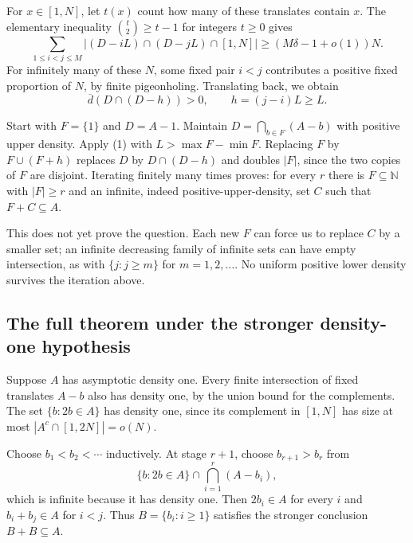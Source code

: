 For $x\in[1,N]$, let $t(x)$ count how many of these translates contain $x$. The elementary inequality $\binom t2\geq t-1$ for integers $t\geq0$ gives
\[
\sum_{1\leq i<j\leq M}|(D-iL)\cap(D-jL)\cap[1,N]|
\geq (M\delta-1+o(1))N.
\]
For infinitely many of these $N$, some fixed pair $i<j$ contributes a positive fixed proportion of $N$, by finite pigeonholing. Translating back, we obtain
\[
\overline d(D\cap(D-h))>0,\qquad h=(j-i)L\geq L.
\tag{1}
\]

Start with $F=\{1\}$ and $D=A-1$. Maintain $D=\bigcap_{b\in F}(A-b)$ with positive upper density. Apply (1) with $L>\max F-\min F$. Replacing $F$ by $F\cup(F+h)$ replaces $D$ by $D\cap(D-h)$ and doubles $|F|$, since the two copies of $F$ are disjoint. Iterating finitely many times proves: for every $r$ there is $F\subseteq\mathbb N$ with $|F|\geq r$ and an infinite, indeed positive-upper-density, set $C$ such that $F+C\subseteq A$.

This does not yet prove the question. Each new $F$ can force us to replace $C$ by a smaller set; an infinite decreasing family of infinite sets can have empty intersection, as with $\{j:j\geq m\}$ for $m=1,2,\ldots$. No uniform positive lower density survives the iteration above.

\subsection{The full theorem under the stronger density-one hypothesis}
Suppose $A$ has asymptotic density one. Every finite intersection of fixed translates $A-b$ also has density one, by the union bound for the complements. The set $\{b:2b\in A\}$ has density one, since its complement in $[1,N]$ has size at most $|A^c\cap[1,2N]|=o(N)$.

Choose $b_1<b_2<\cdots$ inductively. At stage $r+1$, choose $b_{r+1}>b_r$ from
\[
\{b:2b\in A\}\cap\bigcap_{i=1}^r(A-b_i),
\]
which is infinite because it has density one. Then $2b_i\in A$ for every $i$ and $b_i+b_j\in A$ for $i<j$. Thus $B=\{b_i:i\geq1\}$ satisfies the stronger conclusion $B+B\subseteq A$.

